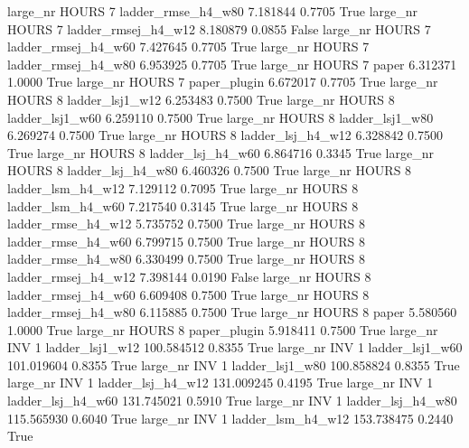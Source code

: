   large_nr    HOURS                 7  ladder_rmse_h4_w80    7.181844      0.7705    True
  large_nr    HOURS                 7 ladder_rmsej_h4_w12    8.180879      0.0855   False
  large_nr    HOURS                 7 ladder_rmsej_h4_w60    7.427645      0.7705    True
  large_nr    HOURS                 7 ladder_rmsej_h4_w80    6.953925      0.7705    True
  large_nr    HOURS                 7               paper    6.312371      1.0000    True
  large_nr    HOURS                 7        paper_plugin    6.672017      0.7705    True
  large_nr    HOURS                 8     ladder_lsj1_w12    6.253483      0.7500    True
  large_nr    HOURS                 8     ladder_lsj1_w60    6.259110      0.7500    True
  large_nr    HOURS                 8     ladder_lsj1_w80    6.269274      0.7500    True
  large_nr    HOURS                 8   ladder_lsj_h4_w12    6.328842      0.7500    True
  large_nr    HOURS                 8   ladder_lsj_h4_w60    6.864716      0.3345    True
  large_nr    HOURS                 8   ladder_lsj_h4_w80    6.460326      0.7500    True
  large_nr    HOURS                 8   ladder_lsm_h4_w12    7.129112      0.7095    True
  large_nr    HOURS                 8   ladder_lsm_h4_w60    7.217540      0.3145    True
  large_nr    HOURS                 8  ladder_rmse_h4_w12    5.735752      0.7500    True
  large_nr    HOURS                 8  ladder_rmse_h4_w60    6.799715      0.7500    True
  large_nr    HOURS                 8  ladder_rmse_h4_w80    6.330499      0.7500    True
  large_nr    HOURS                 8 ladder_rmsej_h4_w12    7.398144      0.0190   False
  large_nr    HOURS                 8 ladder_rmsej_h4_w60    6.609408      0.7500    True
  large_nr    HOURS                 8 ladder_rmsej_h4_w80    6.115885      0.7500    True
  large_nr    HOURS                 8               paper    5.580560      1.0000    True
  large_nr    HOURS                 8        paper_plugin    5.918411      0.7500    True
  large_nr      INV                 1     ladder_lsj1_w12  100.584512      0.8355    True
  large_nr      INV                 1     ladder_lsj1_w60  101.019604      0.8355    True
  large_nr      INV                 1     ladder_lsj1_w80  100.858824      0.8355    True
  large_nr      INV                 1   ladder_lsj_h4_w12  131.009245      0.4195    True
  large_nr      INV                 1   ladder_lsj_h4_w60  131.745021      0.5910    True
  large_nr      INV                 1   ladder_lsj_h4_w80  115.565930      0.6040    True
  large_nr      INV                 1   ladder_lsm_h4_w12  153.738475      0.2440    True
